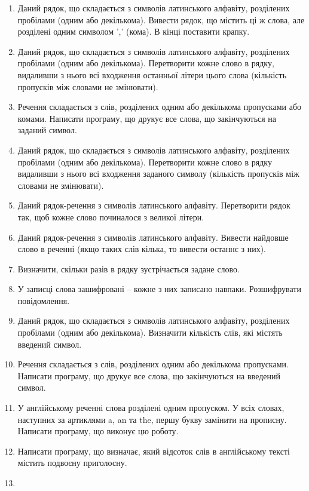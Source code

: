 \documentclass[]{article}
\makeatletter
\newcommand{\xslalph}[1]{\expandafter\@xslalph\csname c@#1\endcsname}
\newcommand{\@xslalph}[1]{%
    \ifcase#1\or а\or б\or в\or г\or д\or e\or є\or ж\or з\or i%
    \or й\or к\or л\or м\or н\or о\or п\or р\or с\or т%
    \or у\or ф\or х\or ц\or ч\or ш\or ю\or я\or аа\or бб\or вв%
    \else\@ctrerr\fi%
}
\makeatother
\begin{document}
\begin{enumerate}
\begin{enumerate}[label=\xslalph*)]
\begin{enumerate}
\begin{enumerate}[label=\xslalph*)]
\begin{enumerate}
\def\labelenumi{\arabic{enumi})}
\setcounter{enumi}{8}
\item
  Даний рядок, що складається з символів латинського алфавіту,
  розділених пробілами (одним або декількома). Вивести рядок, що містить
  ці ж слова, але розділені одним символом ',' (кома). В кінці
  поставити крапку.
\item
  Даний рядок, що складається з символів латинського алфавіту,
  розділених пробілами (одним або декількома). Перетворити кожне слово в
  рядку, видаливши з нього всі входження останньої літери цього слова
  (кількість пропусків між словами не змінювати).
\item
  Речення складається з слів, розділених одним або декількома
  пропусками або комами. Написати програму, що друкує все слова, що закінчуються на
  заданий символ.
\item
  Даний рядок, що складається з символів латинського алфавіту,
  розділених пробілами (одним або декількома). Перетворити кожне слово в
  рядку видаливши з нього всі входження заданого символу (кількість
  пропусків між словами не змінювати).
\item
  Даний рядок-речення з символів латинського алфавіту. Перетворити рядок
  так, щоб кожне слово починалося з великої літери.
\item
  Даний рядок-речення з символів латинського алфавіту. Вивести найдовше
  слово в реченні (якщо таких слів кілька, то вивести останнє з них).
\item
  Визначити, скільки разів в рядку зустрічається задане слово.
\item
  У записці слова зашифровані -- кожне з них записано навпаки. Розшифрувати повідомлення.
\item
  Даний рядок, що складається з символів латинського алфавіту,
  розділених пробілами (одним або декількома). Визначити кількість слів,
  які містять введений символ.
\item
  Речення складається з слів, розділених одним або декількома
  пропусками. Написати програму, що друкує все слова, що закінчуються на
  введений символ.
\item
  У англійському реченні слова розділені одним пропуском. У всіх словах,
  наступних за артиклями a, an та the, першу букву замінити на прописну.
  Написати програму, що виконує цю роботу.
\item
  Написати програму, що визначає, який відсоток слів в англійському
  тексті містить подвоєну приголосну.
\item

\end{enumerate}
\end{enumerate}
\end{enumerate}
\end{enumerate}
\end{enumerate}
\end{document}
